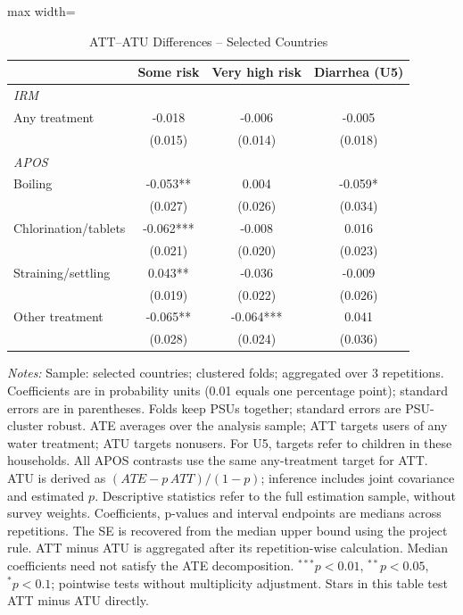 \documentclass[10pt]{article}
\begin{document}
\clearpage
\begin{table}[H]
\centering
\caption{ATT--ATU Differences -- Selected Countries}
\label{tab:ate-att-atu-selected-countries-clustered-aggregated-difference}
\scriptsize
\setlength{\tabcolsep}{4pt}
\renewcommand{\arraystretch}{0.92}
\begin{adjustbox}{max width=\linewidth}
\begin{tabular}{lccc}
\hline\hline
 & Some risk & Very high risk & Diarrhea (U5) \\
\midrule
\multicolumn{4}{l}{\textit{IRM}} \\
Any treatment & -0.018 & -0.006 & -0.005 \\
 & (0.015) & (0.014) & (0.018) \\
\midrule
\multicolumn{4}{l}{\textit{APOS}} \\
Boiling & -0.053** & 0.004 & -0.059* \\
 & (0.027) & (0.026) & (0.034) \\
Chlorination/tablets & -0.062*** & -0.008 & 0.016 \\
 & (0.021) & (0.020) & (0.023) \\
Straining/settling & 0.043** & -0.036 & -0.009 \\
 & (0.019) & (0.022) & (0.026) \\
Other treatment & -0.065** & -0.064*** & 0.041 \\
 & (0.028) & (0.024) & (0.036) \\
\hline\hline
\end{tabular}
\end{adjustbox}
\par\vspace{3pt}
\begin{minipage}{\linewidth}\scriptsize \textit{Notes:} Sample: selected countries; clustered folds; aggregated over 3 repetitions. Coefficients are in probability units (0.01 equals one percentage point); standard errors are in parentheses. Folds keep PSUs together; standard errors are PSU-cluster robust. ATE averages over the analysis sample; ATT targets users of any water treatment; ATU targets nonusers. For U5, targets refer to children in these households. All APOS contrasts use the same any-treatment target for ATT. ATU is derived as $(ATE-p\,ATT)/(1-p)$; inference includes joint covariance and estimated $p$. Descriptive statistics refer to the full estimation sample, without survey weights. Coefficients, p-values and interval endpoints are medians across repetitions. The SE is recovered from the median upper bound using the project rule. ATT minus ATU is aggregated after its repetition-wise calculation. Median coefficients need not satisfy the ATE decomposition. $^{***}p<0.01$, $^{**}p<0.05$, $^{*}p<0.1$; pointwise tests without multiplicity adjustment. Stars in this table test ATT minus ATU directly.\end{minipage}
\end{table}
\end{document}
